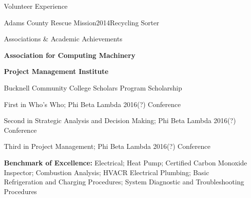 \documentclass{resume} %
\begin{document}
\begin{rSection}{Volunteer Experience}

\begin{rVolunteerCondensed}{Adams County Rescue Mission}{2014}{Recycling Sorter}{}
\end{rVolunteerCondensed}

\iffalse
\begin{rWorkSubsection}{Sinai Hospital, ER7}{1999}{Illegal Child Labor}{}
\item Copied, filed, shredded and recorded hospital documents under the direction of staff; ran errands and delivered messages throughout hospital
\end{rWorkSubsection}
\fi
\end{rSection}
\fi

\begin{rSection}{Associations \& Academic Achievements} \itemsep -2pt \vspace{-1.0em}


\item {\bf Association for Computing Machinery}
\item {\bf Project Management Institute}
\item Bucknell Community College Scholars Program Scholarship
\iffalse
\item Graduated {\it cum laude} from Bucknell University
\item {\bf Dean's List:} Spring 2019; Fall 2016; Spring 2016; Fall 2015; Academic Year 2015
\item Outstanding Freshman Math/Computer Science Student
\item Outstanding Sophomore Math/Computer Science Student
\item 2016 Bucknell Community College Scholars Program
\item SGA Senator of the Semester; Fall 2015
\fi
\item First in Who's Who; Phi Beta Lambda 2016(?) Conference
\item Second in Strategic Analysis and Decision Making; Phi Beta Lambda 2016(?) Conference
\item Third in Project Management; Phi Beta Lambda 2016(?) Conference
\item {\bf Benchmark of Excellence:} Electrical; Heat Pump; Certified Carbon Monoxide Inspector; Combustion Analysis; HVACR Electrical Plumbing; Basic Refrigeration and Charging Procedures; System Diagnostic and Troubleshooting Procedures


\end{rSection}
\end{document}

